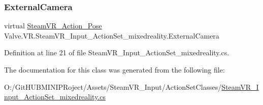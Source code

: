 \subsubsection{\texorpdfstring{ExternalCamera}{ExternalCamera}}
{\footnotesize\ttfamily virtual \mbox{\hyperlink{class_valve_1_1_v_r_1_1_steam_v_r___action___pose}{Steam\+V\+R\+\_\+\+Action\+\_\+\+Pose}} Valve.\+V\+R.\+Steam\+V\+R\+\_\+\+Input\+\_\+\+Action\+Set\+\_\+mixedreality.\+External\+Camera\hspace{0.3cm}{\ttfamily [get]}}



Definition at line 21 of file Steam\+V\+R\+\_\+\+Input\+\_\+\+Action\+Set\+\_\+mixedreality.\+cs.



The documentation for this class was generated from the following file\+:\begin{DoxyCompactItemize}
\item 
O\+:/\+Git\+H\+U\+B\+M\+I\+N\+I\+P\+Roject/\+Assets/\+Steam\+V\+R\+\_\+\+Input/\+Action\+Set\+Classes/\mbox{\hyperlink{_steam_v_r___input___action_set__mixedreality_8cs}{Steam\+V\+R\+\_\+\+Input\+\_\+\+Action\+Set\+\_\+mixedreality.\+cs}}\end{DoxyCompactItemize}
